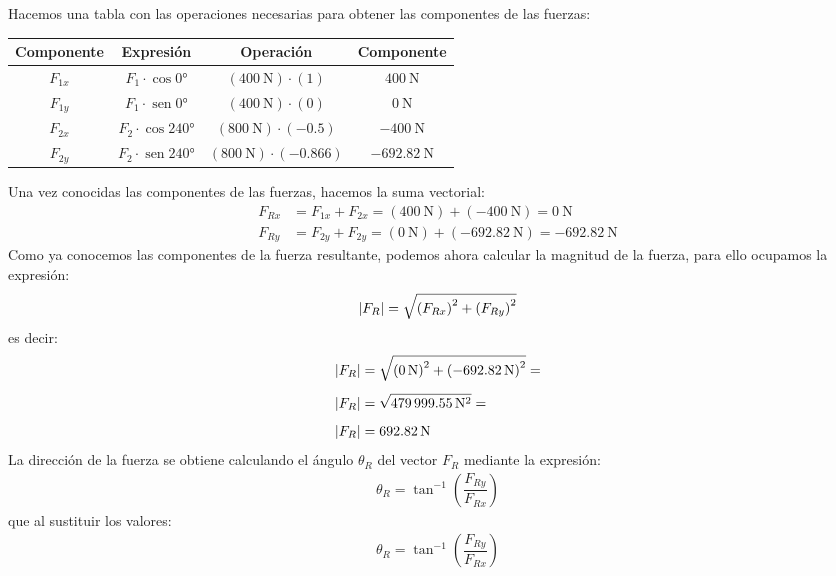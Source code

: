 \documentclass[14pt]{extarticle}
\renewcommand{\sin}{\operatorname{sen}}
\begin{document}
Hacemos una tabla con las operaciones necesarias para obtener las componentes de las fuerzas:
\begin{table}[H]
\centering
\begin{tabular}{c | c | c | c}
Componente & Expresión & Operación & Componente \\ \hline
$F_{1x}$ & $F_{1} \cdot \cos \ang{0}$ & $\left(\SI{400}{\newton}\right) \cdot \left( 1 \right)$ & $\SI{400}{\newton}$ \\ \hline
$F_{1y}$ & $F_{1} \cdot \sin \ang{0}$ & $\left(\SI{400}{\newton}\right) \cdot \left( 0 \right)$ & $\SI{0}{\newton}$  \\ \hline
$F_{2x}$ & $F_{2} \cdot \cos \ang{240}$ & $\left(\SI{800}{\newton}\right) \cdot \left( - 0.5 \right)$ & $- \SI{400}{\newton}$ \\ \hline
$F_{2y}$ & $F_{2} \cdot \sin \ang{240}$ & $\left(\SI{800}{\newton}\right) \cdot \left( -0.866 \right)$ & $- \SI{692.82}{\newton}$ \\ \hline
\end{tabular}
\end{table}

Una vez conocidas las componentes de las fuerzas, hacemos la suma vectorial:
\begin{align*}
F_{Rx} &= F_{1x} + F_{2x} = \left( \SI{400}{\newton} \right) + \left( - \SI{400}{\newton} \right) = \SI{0}{\newton} \\[0.5em]
F_{Ry} &= F_{2y} + F_{2y} = \left( \SI{0}{\newton} \right) + \left( - \SI{692.82}{\newton} \right) = - \SI{692.82}{\newton}
\end{align*}
Como ya conocemos las componentes de la fuerza resultante, podemos ahora calcular la magnitud de la fuerza, para ello ocupamos la expresión:
\begin{align*}
\abs{F_{R}} = \sqrt{\left( F_{Rx} \right)^{2} + \left( F_{Ry} \right)^{2}}
\end{align*}
es decir:
\begin{align*}
\abs{F_{R}} &= \sqrt{\left( \SI{0}{\newton} \right)^{2} + \left( - \SI{692.82}{\newton} \right)^{2}} = \\[0.5em]
\abs{F_{R}} &= \sqrt{\SI{479999.55}{\square\newton}} = \\[0.5em]
\abs{F_{R}} &= \SI{692.82}{\newton}
\end{align*}
La dirección de la fuerza se obtiene calculando el ángulo $\theta_{R}$ del vector $F_{R}$ mediante la expresión:
\begin{align*}
\theta_{R} = \tan^{-1} \left( \dfrac{F_{Ry}}{F_{Rx}} \right)
\end{align*}
que al sustituir los valores:
\begin{align*}
\theta_{R} = \tan^{-1} \left( \dfrac{F_{Ry}}{F_{Rx}} \right)
\end{align*}
     
\end{document}
